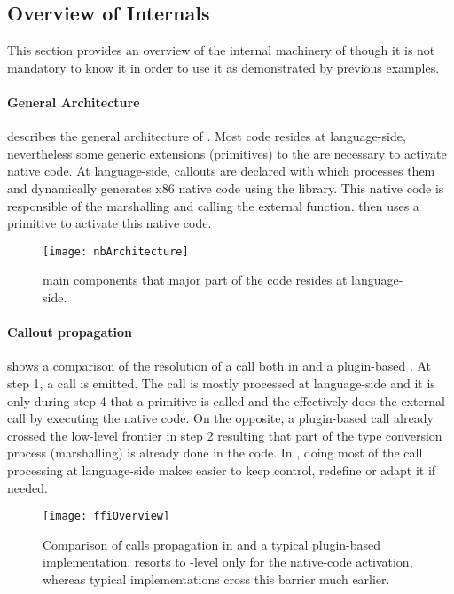 \subsection{Overview of \NBFFI Internals}

This section provides an overview of the internal machinery of \NBFFI though it is not mandatory to know it in order to use it as demonstrated by previous examples.

\paragraph{General Architecture}
 describes the general architecture of \NB.
Most code resides at language-side, nevertheless some generic extensions (primitives) to the \VM are necessary to activate native code.
At language-side, callouts are declared with \NBFFI which processes them and dynamically generates x86 native code using the  library.
This native code is responsible of the marshalling and calling the external function.
\NB then uses a primitive to activate this native code.

\begin{figure}[ht]
	\centering
	\texttt{[image: nbArchitecture]}
	\caption[\NB Components Layering]{\NB main components that major part of the code resides at language-side.}
\end{figure}

\paragraph{Callout propagation}
 shows a comparison of the resolution of a \FFI call both in \NBFFI and a plugin-based \FFI.
At step 1, a \FFI call is emitted.
The \NBFFI call is mostly processed at language-side and it is only during step 4 that a primitive is called and the \VM effectively does the external call by executing the native code.
On the opposite, a plugin-based \FFI call already crossed the low-level frontier in step 2 resulting that part of the type conversion process (marshalling) is already done in the \VM code.
In \NBFFI, doing most of the \FFI call processing at language-side makes easier to keep control, redefine or adapt it if needed.

\begin{figure*}[h]
	\begin{adjustwidth}{-2.0in}{-2.0in}
		\centering
		\texttt{[image: ffiOverview]}
	\end{adjustwidth}
	\caption[\FFI Implementation Comparison]{Comparison of \FFI calls propagation in \NBFFI and a typical \VM plugin-based implementation. \NB resorts to \VM-level only for the native-code activation, whereas typical implementations cross this barrier much earlier.}
\end{figure*}

